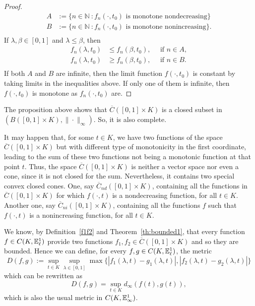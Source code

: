 \documentclass{amsart}
\newcommand{\N}{{\mathbb{N}}}
\newcommand{\fn}{\mathbb{E}\sp{1}}
\begin{document}
\begin{proof}
\begin{align*}
A&:=\{n\in \N\ : f_n(\cdot,t_0) \text{ is monotone nondecreasing}\}\\
B&:=\{n\in \N\ : f_n(\cdot,t_0) \text{ is monotone nonincreasing}\}.\\
\end{align*}
If $\lambda,\beta\in [0,1]$ and $\lambda\leq \beta$, then
\begin{align*}
f_n(\lambda,t_0)&\leq f_n(\beta,t_0), \quad\text{ if $n\in A$},\\
f_n(\lambda,t_0)&\geq f_n(\beta,t_0), \quad\text{ if $n\in B$}.\\
\end{align*}
If both $A$ and $B$ are infinite, then the limit function $f(\cdot,t_0)$ is constant by taking limits in the inequalities above. If only one of them is infinite, then
$f(\cdot,t_0)$ is monotone as $f_n(\cdot,t_0)$ are.
\end{proof}

The proposition above shows that $\overline{C}([0,1]\times K)$ is a closed subset in $(B([0,1]\times K),\|\cdot\|_{\infty})$. So, it is also complete.

\medskip
It may happen that, for some $t \in K$, we have two functions of the space $\overline{C}([0,1]\times K)$ but with different type of monotonicity in the first coordinate, leading to the sum of these two functions not being a monotonic function at that point $t$. Thus, the space  $\overline{C}([0,1]\times K)$  is neither a vector space nor even a cone, since it is not closed for the sum.
  Nevertheless, it contains two special convex closed cones. One,  say
  $\overline{C}_{nd}([0,1]\times K)$, containing all the functions in $\overline{C}([0,1]\times K)$ for which $f(\cdot,t)$ is a nondecreasing function, for all $t\in K$. Another one, say $\overline{C}_{ni}([0,1]\times K)$, containing all the functions $f$ such that $f(\cdot, t)$ is a nonincreasing function, for all $t\in K$.

We know, by Definition~\ref{f1f2} and Theorem~\ref{th:bounded1}, that every function $f\in C(K,\fn_{\ell})$ provide two functions $f_1,f_2\in \overline{C}([0,1]\times K)$ and so they are bounded.
Hence we can define, for every $f,g\in C(K,\fn_{\ell})$, the metric
\[
D(f,g):=\sup_{t\in K}\sup_{\lambda\in [0,1]}\max\{|f_1(\lambda,t)-g_1(\lambda,t)|,|f_2(\lambda,t)-g_2(\lambda,t)|\}
\]
which can be rewritten as
\[
D(f,g)=\sup_{t\in K}d_{\infty}(f(t), g(t)),
\]
which is also the usual metric in $C(K,\fn_{\infty})$.
\end{document}
